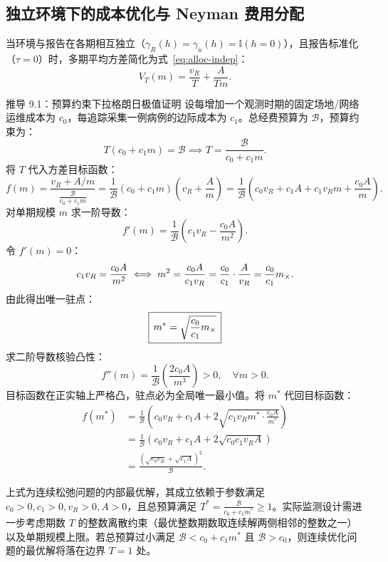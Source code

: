 \subsection{独立环境下的成本优化与 Neyman 费用分配}

当环境与报告在各期相互独立（$\gamma_R(h) = \gamma_u(h) = \mathbb{I}(h=0)$），且报告标准化（$\tau = 0$）时，多期平均方差简化为式~\eqref{eq:alloc-indep}：
\begin{equation}
  V_T(m) = \frac{v_R}{T} + \frac{A}{Tm}.
  \label{eq:alloc-indep}
\end{equation}

\begin{theorembox}{推导 9.1：预算约束下拉格朗日极值证明}
设每增加一个观测时期的固定场地/网络运维成本为 $c_0$，每追踪采集一例病例的边际成本为 $c_1$。总经费预算为 $\mathcal{B}$，预算约束为：
\begin{equation}
  T(c_0 + c_1 m) = \mathcal{B} \implies T = \frac{\mathcal{B}}{c_0 + c_1 m}.
\end{equation}
将 $T$ 代入方差目标函数：
\begin{equation}
  f(m) = \frac{v_R + A/m}{\frac{\mathcal{B}}{c_0 + c_1 m}} = \frac{1}{\mathcal{B}} (c_0 + c_1 m)\left( v_R + \frac{A}{m} \right) = \frac{1}{\mathcal{B}} \left( c_0 v_R + c_1 A + c_1 v_R m + \frac{c_0 A}{m} \right).
\end{equation}
对单期规模 $m$ 求一阶导数：
\begin{equation}
  f'(m) = \frac{1}{\mathcal{B}} \left( c_1 v_R - \frac{c_0 A}{m^2} \right).
\end{equation}
令 $f'(m) = 0$：
\begin{equation}
  c_1 v_R = \frac{c_0 A}{m^2} \iff m^2 = \frac{c_0 A}{c_1 v_R} = \frac{c_0}{c_1} \cdot \frac{A}{v_R} = \frac{c_0}{c_1} m_\times.
\end{equation}
由此得出唯一驻点：
\begin{equation}
  \boxed{\, m^* = \sqrt{\frac{c_0}{c_1} m_\times} \,}
  \label{eq:opt-m-neyman}
\end{equation}
求二阶导数核验凸性：
\begin{equation}
  f''(m) = \frac{1}{\mathcal{B}} \left( \frac{2 c_0 A}{m^3} \right) > 0, \quad \forall m > 0.
\end{equation}
目标函数在正实轴上严格凸，驻点必为全局唯一最小值。将 $m^*$ 代回目标函数：
\begin{align}
  f(m^*) &= \frac{1}{\mathcal{B}} \left( c_0 v_R + c_1 A + 2\sqrt{c_1 v_R m^* \cdot \frac{c_0 A}{m^*}} \right) \nonumber \\
  &= \frac{1}{\mathcal{B}} \left( c_0 v_R + c_1 A + 2\sqrt{c_0 c_1 v_R A} \right) \nonumber \\
  &= \frac{(\sqrt{c_0 v_R} + \sqrt{c_1 A})^2}{\mathcal{B}}.
\end{align}

上式为连续松弛问题的内部最优解，其成立依赖于参数满足 $c_0 > 0, c_1 > 0, v_R > 0, A > 0$，且总预算满足 $T^* = \frac{\mathcal{B}}{c_0 + c_1 m^*} \ge 1$。实际监测设计需进一步考虑期数 $T$ 的整数离散约束（最优整数期数取连续解两侧相邻的整数之一）以及单期规模上限。若总预算过小满足 $\mathcal{B} < c_0 + c_1 m^*$ 且 $\mathcal{B} > c_0$，则连续优化问题的最优解将落在边界 $T = 1$ 处。
\end{theorembox}

